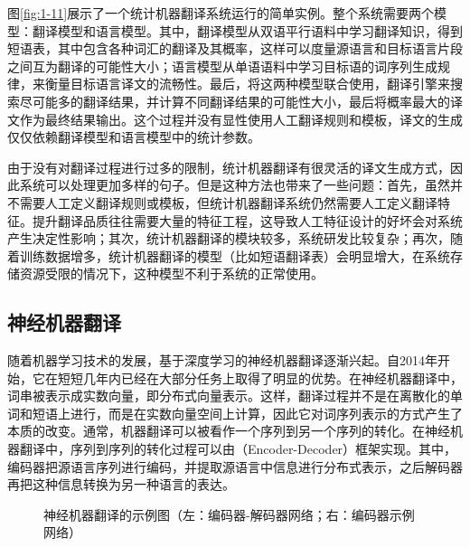 \parinterval 图\ref{fig:1-11}展示了一个统计机器翻译系统运行的简单实例。整个系统需要两个模型：翻译模型和语言模型。其中，翻译模型从双语平行语料中学习翻译知识，得到短语表，其中包含各种词汇的翻译及其概率，这样可以度量源语言和目标语言片段之间互为翻译的可能性大小；语言模型从单语语料中学习目标语的词序列生成规律，来衡量目标语言译文的流畅性。最后，将这两种模型联合使用，翻译引擎来搜索尽可能多的翻译结果，并计算不同翻译结果的可能性大小，最后将概率最大的译文作为最终结果输出。这个过程并没有显性使用人工翻译规则和模板，译文的生成仅仅依赖翻译模型和语言模型中的统计参数。

\parinterval 由于没有对翻译过程进行过多的限制，统计机器翻译有很灵活的译文生成方式，因此系统可以处理更加多样的句子。但是这种方法也带来了一些问题：首先，虽然并不需要人工定义翻译规则或模板，但统计机器翻译系统仍然需要人工定义翻译特征。提升翻译品质往往需要大量的特征工程，这导致人工特征设计的好坏会对系统产生决定性影响；其次，统计机器翻译的模块较多，系统研发比较复杂；再次，随着训练数据增多，统计机器翻译的模型（比如短语翻译表）会明显增大，在系统存储资源受限的情况下，这种模型不利于系统的正常使用。


\subsection{神经机器翻译}

\parinterval 随着机器学习技术的发展，基于深度学习的神经机器翻译逐渐兴起。自2014年开始，它在短短几年内已经在大部分任务上取得了明显的优势\cite{NIPS2014_5346,bahdanau2014neural}。在神经机器翻译中，词串被表示成实数向量，即分布式向量表示。这样，翻译过程并不是在离散化的单词和短语上进行，而是在实数向量空间上计算，因此它对词序列表示的方式产生了本质的改变。通常，机器翻译可以被看作一个序列到另一个序列的转化。在神经机器翻译中，序列到序列的转化过程可以由{\small{}}（Encoder-Decoder）框架实现。其中，编码器把源语言序列进行编码，并提取源语言中信息进行分布式表示，之后解码器再把这种信息转换为另一种语言的表达。

\begin{figure}[htp]
    \centering

    \caption{神经机器翻译的示例图（左：编码器-解码器网络；右：编码器示例网络）}
    \label{fig:1-12}
\end{figure}

